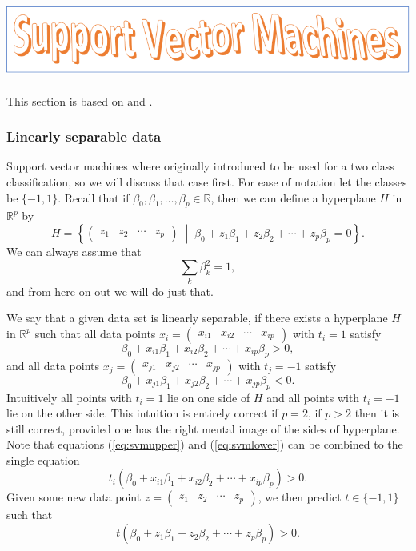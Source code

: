 \documentclass[parskip=half]{scrartcl}
\newcommand{\setof}[2]{\left\{ #1 \; \middle\vert \; #2 \right\}}
\theoremstyle{definition}
\theoremstyle{remark}
\newcommand{\R}{\mathbb{R}}
\begin{document}
\subsection{\protect\includegraphics{svmheading.png}}

This section is based on \cite[Chapter 9]{jwht:intro} and \cite[Chapter 12]{htf:esl}.

\subsubsection{Linearly separable data}

Support vector machines where originally introduced to be used for a two class classification, so we will discuss that case first. 
For ease of notation let the classes be $\{-1,1\}$.
Recall that if $\beta_0, \beta_1, \ldots, \beta_p \in \R$, then we can define a hyperplane $H$ in $\R^p$ by 
\[
	H = \setof{\begin{pmatrix} z_1 & z_2  & \cdots & z_p \end{pmatrix}}{\beta_0 + z_1 \beta_1 + z_2 \beta_2 + \cdots + z_p \beta_p = 0}. 
\]  
We can always assume that  
\[
	\sum_k \beta_k^2 = 1,
\]
and from here on out we will do just that. 

We say that a given data set is linearly separable, if there exists a hyperplane $H$ in $\R^p$ such that all data points $x_i = \begin{pmatrix} x_{i1} & x_{i2}  & \cdots & x_{ip} \end{pmatrix}$ with $t_i = 1$ satisfy 
\begin{equation} \label{eq:svmupper}
	\beta_0 + x_{i1} \beta_1 + x_{i2} \beta_2 + \cdots + x_{ip} \beta_p > 0,
\end{equation}
and all data points $x_j = \begin{pmatrix} x_{j1} & x_{j2}  & \cdots & x_{jp} \end{pmatrix}$ with $t_j = -1$ satisfy
\begin{equation} \label{eq:svmlower}
	\beta_0 + x_{j1} \beta_1 + x_{j2} \beta_2 + \cdots + x_{jp} \beta_p < 0.
\end{equation}
Intuitively all points with $t_i = 1$ lie on one side of $H$ and all points with $t_i = -1$ lie on the other side. 
This intuition is entirely correct if $p = 2$, if $p>2$ then it is still correct, provided one has the right mental image of the sides of hyperplane. 
Note that equations (\ref{eq:svmupper}) and (\ref{eq:svmlower}) can be combined to the single equation
\begin{equation} \label{eq:svmsep}
	t_i(\beta_0 + x_{i1} \beta_1 + x_{i2} \beta_2 + \cdots + x_{ip} \beta_p) > 0.
\end{equation}
Given some new data point $z = \begin{pmatrix} z_1 & z_2  & \cdots & z_p \end{pmatrix}$, we then predict $t \in \{-1,1\}$ such that
\[
	t(\beta_0 + z_1 \beta_1 + z_2 \beta_2 + \cdots + z_p \beta_p) > 0.
\] 
\end{document}
